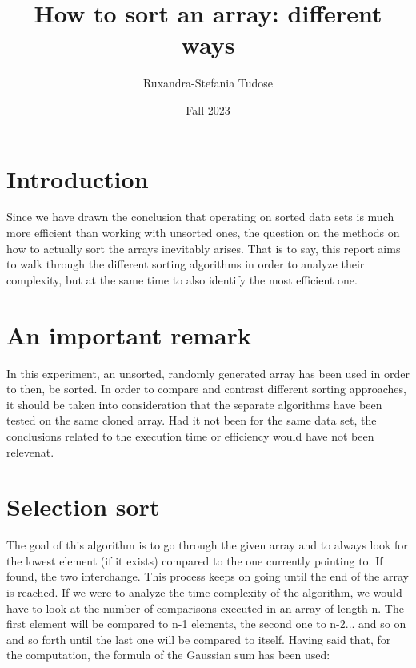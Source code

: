 \documentclass[a4paper,11pt]{article}
\begin{document}
\title{
    \textbf{How to sort an array: different ways}
}
\author{Ruxandra-Stefania Tudose}
\date{Fall 2023}

\maketitle

\section*{Introduction}

Since we have drawn the conclusion that operating on sorted data sets is much more efficient than working with unsorted 
ones, the question on the methods on how to actually sort the arrays inevitably arises. That is to say, this report aims 
to walk through the different sorting algorithms in order to analyze their complexity,
but at the same time to also identify the most efficient one.

\section*{An important remark}

In this experiment, an unsorted, randomly generated array has been used in order to then, be sorted. In order to compare and contrast 
different sorting approaches, it should be taken into consideration that the separate algorithms have been tested on the same cloned array.
Had it not been for the same data set, the conclusions related to the execution time or efficiency would have not been relevenat. 

\section*{Selection sort}

The goal of this algorithm is to go through the given array and to always look for the lowest element (if it exists) compared to the one currently 
pointing to. If found, the two interchange. This process keeps on going until the end of the array is reached. 
If we were to analyze the time complexity of the algorithm, we would have to look at the number of comparisons executed in an array of length n.
The first element will be compared to n-1 elements, the second one to n-2... and so on and so forth until the last one will be compared to itself.
Having said that, for the computation, the formula of the Gaussian sum has been used:
\end{document}

